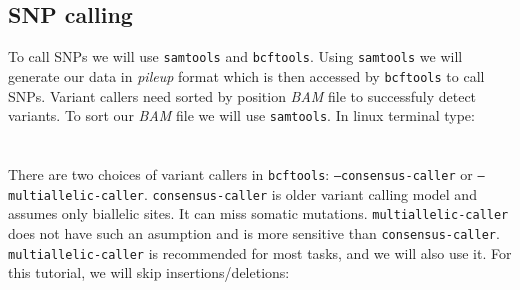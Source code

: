 \subsection{SNP calling}

To call SNPs we will use \texttt{samtools} and \texttt{bcftools}.
Using \texttt{samtools} we will generate our data in \textit{pileup} format which
is then accessed by \texttt{bcftools} to call SNPs.
Variant callers need sorted by position \textit{BAM} file to successfuly detect variants.
To sort our \textit{BAM} file we will use \texttt{samtools}. In linux terminal type:\\~\\
\\

There are two choices of variant callers in \texttt{bcftools}:
\texttt{--consensus-caller} or \texttt{--multiallelic-caller}. \texttt{consensus-caller} is
older variant calling model and assumes only biallelic sites. It can miss somatic mutations.
\texttt{multiallelic-caller} does not have such an asumption and is more sensitive than \texttt{consensus-caller}.
\texttt{multiallelic-caller} is recommended for most tasks, and we will also use it. For this tutorial, we will skip insertions/deletions: \\~\\
